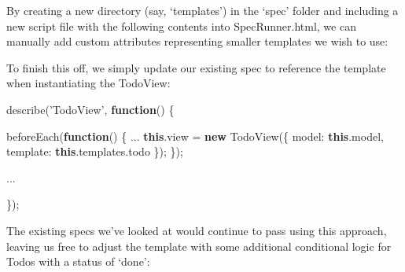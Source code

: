 \documentclass[9pt]{book}
\newenvironment{Shaded}{}{}
\newcommand{\KeywordTok}[1]{\textcolor[rgb]{0.00,0.44,0.13}{\textbf{{#1}}}}
\newcommand{\DataTypeTok}[1]{\textcolor[rgb]{0.56,0.13,0.00}{{#1}}}
\newcommand{\StringTok}[1]{\textcolor[rgb]{0.25,0.44,0.63}{{#1}}}
\newcommand{\OtherTok}[1]{\textcolor[rgb]{0.00,0.44,0.13}{{#1}}}
\newcommand{\FunctionTok}[1]{\textcolor[rgb]{0.02,0.16,0.49}{{#1}}}
\newcommand{\NormalTok}[1]{{#1}}
\begin{document}
By creating a new directory (say, `templates') in the `spec' folder and
including a new script file with the following contents into
SpecRunner.html, we can manually add custom attributes representing
smaller templates we wish to use:

\begin{Shaded}
\end{Shaded}

To finish this off, we simply update our existing spec to reference the
template when instantiating the TodoView:

\begin{Shaded}
\begin{Highlighting}[]
\FunctionTok{describe}\NormalTok{(}\StringTok{'TodoView'}\NormalTok{, }\KeywordTok{function}\NormalTok{() \{}

  \FunctionTok{beforeEach}\NormalTok{(}\KeywordTok{function}\NormalTok{() \{}
    \NormalTok{...}
    \KeywordTok{this}\NormalTok{.}\FunctionTok{view} \NormalTok{= }\KeywordTok{new} \FunctionTok{TodoView}\NormalTok{(\{}
      \DataTypeTok{model}\NormalTok{: }\KeywordTok{this}\NormalTok{.}\FunctionTok{model}\NormalTok{,}
      \DataTypeTok{template}\NormalTok{: }\KeywordTok{this}\NormalTok{.}\OtherTok{templates}\NormalTok{.}\FunctionTok{todo}
    \NormalTok{\});}
  \NormalTok{\});}

  \NormalTok{...}

\NormalTok{\});}
\end{Highlighting}
\end{Shaded}

The existing specs we've looked at would continue to pass using this
approach, leaving us free to adjust the template with some additional
conditional logic for Todos with a status of `done':

\begin{Shaded}
\end{Shaded}
\end{document}
